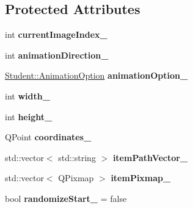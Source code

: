 \subsection*{Protected Attributes}
\begin{DoxyCompactItemize}
\item 
\hypertarget{class_student_1_1_free_scene_item_a86cf90f2019987e9ae0bc097db8badd0}{int {\bfseries current\-Image\-Index\-\_\-}}\label{class_student_1_1_free_scene_item_a86cf90f2019987e9ae0bc097db8badd0}

\item 
\hypertarget{class_student_1_1_free_scene_item_a629a611260871c2caa59025199c18e5b}{int {\bfseries animation\-Direction\-\_\-}}\label{class_student_1_1_free_scene_item_a629a611260871c2caa59025199c18e5b}

\item 
\hypertarget{class_student_1_1_free_scene_item_a6c29c664674ef9090c13f2201f364471}{\hyperlink{class_student_1_1_animation_option}{Student\-::\-Animation\-Option} {\bfseries animation\-Option\-\_\-}}\label{class_student_1_1_free_scene_item_a6c29c664674ef9090c13f2201f364471}

\item 
\hypertarget{class_student_1_1_free_scene_item_ac75b90ddf2bff071978601b48118caa9}{int {\bfseries width\-\_\-}}\label{class_student_1_1_free_scene_item_ac75b90ddf2bff071978601b48118caa9}

\item 
\hypertarget{class_student_1_1_free_scene_item_a528fc67a466cd33e835d141e4996309b}{int {\bfseries height\-\_\-}}\label{class_student_1_1_free_scene_item_a528fc67a466cd33e835d141e4996309b}

\item 
\hypertarget{class_student_1_1_free_scene_item_a98673a5fb5ade303250717e541330ad9}{Q\-Point {\bfseries coordinates\-\_\-}}\label{class_student_1_1_free_scene_item_a98673a5fb5ade303250717e541330ad9}

\item 
\hypertarget{class_student_1_1_free_scene_item_a129d520d98ff85917b269f5baebbee47}{std\-::vector$<$ std\-::string $>$ {\bfseries item\-Path\-Vector\-\_\-}}\label{class_student_1_1_free_scene_item_a129d520d98ff85917b269f5baebbee47}

\item 
\hypertarget{class_student_1_1_free_scene_item_a57379a89a266d431bc135018a5d4fbd3}{std\-::vector$<$ Q\-Pixmap $>$ {\bfseries item\-Pixmap\-\_\-}}\label{class_student_1_1_free_scene_item_a57379a89a266d431bc135018a5d4fbd3}

\item 
\hypertarget{class_student_1_1_free_scene_item_ad37e14d2c49aba173c9fda1026b286a9}{bool {\bfseries randomize\-Start\-\_\-} = false}\label{class_student_1_1_free_scene_item_ad37e14d2c49aba173c9fda1026b286a9}

\end{DoxyCompactItemize}


